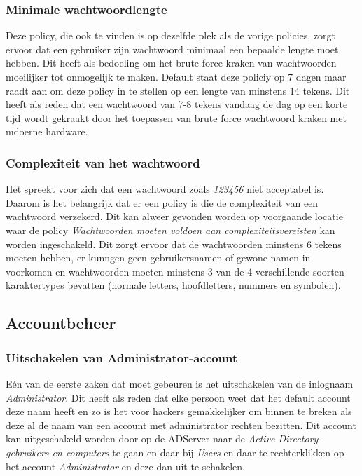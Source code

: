 \documentclass[pdftex,a4paper,12pt]{report}
\begin{document}
\subsubsection{Minimale wachtwoordlengte}
Deze policy, die ook te vinden is op dezelfde plek als de vorige policies, zorgt ervoor dat een gebruiker zijn wachtwoord minimaal een bepaalde lengte moet hebben. Dit heeft als bedoeling om het brute force kraken van wachtwoorden moeilijker tot onmogelijk te maken. Default staat deze policiy op 7 dagen maar \cite{Stanek2009} raadt aan om deze policy in te stellen op een lengte van minstens 14 tekens. Dit heeft als reden dat een wachtwoord van 7-8 tekens vandaag de dag op een korte tijd wordt gekraakt door het toepassen van brute force wachtwoord kraken met mdoerne hardware.

\subsubsection{Complexiteit van het wachtwoord}
Het spreekt voor zich dat een wachtwoord zoals \textit{123456} niet acceptabel is. Daarom is het belangrijk dat er een policy is die de complexiteit van een wachtwoord verzekerd. Dit kan alweer gevonden worden op voorgaande locatie waar de policy \textit{Wachtwoorden moeten voldoen aan complexiteitsvereisten} kan worden ingeschakeld. Dit zorgt ervoor dat de wachtwoorden minstens 6 tekens moeten hebben, er kunngen geen gebruikersnamen of gewone namen in voorkomen en wachtwoorden moeten minstens 3 van de 4 verschillende soorten karaktertypes bevatten (normale letters, hoofdletters, nummers en symbolen). \citep{Stanek2009}

\subsection{Accountbeheer}
\subsubsection{Uitschakelen van Administrator-account}
Eén van de eerste zaken dat moet gebeuren is het uitschakelen van de inlognaam \textit{Administrator}. Dit heeft als reden dat elke persoon weet dat het default account deze naam heeft en zo is het voor hackers gemakkelijker om binnen te breken als deze al de naam van een account met administrator rechten bezitten. Dit account kan uitgeschakeld worden door op de ADServer naar de \textit{Active Directory - gebruikers en computers} te gaan en daar bij \textit{Users} en daar te rechterklikken op het account \textit{Administrator} en deze dan uit te schakelen.
\end{document}
